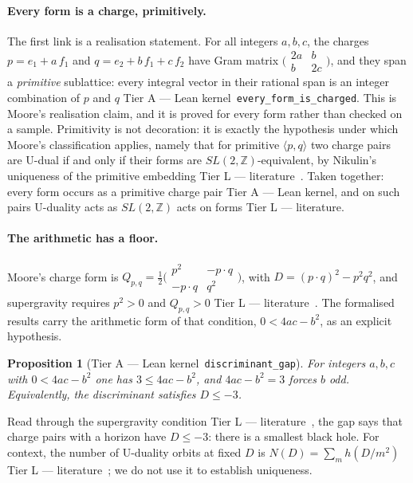 \documentclass[11pt,a4paper]{article}
\newtheorem{proposition}[theorem]{Proposition}
\theoremstyle{remark}
\newcommand{\tierA}{\colorbox{green!15}{\textsf{\scriptsize Tier A --- Lean kernel}}}
\newcommand{\tierL}{\colorbox{blue!10}{\textsf{\scriptsize Tier L --- literature}}}
\newcommand{\lean}[1]{\texttt{#1}}
\begin{document}
\paragraph{Every form is a charge, primitively.} The first link is a realisation statement. For all integers $a,b,c$, the charges $p=e_1+a\,f_1$ and $q=e_2+b\,f_1+c\,f_2$ have Gram matrix $\bigl(\begin{smallmatrix}2a&b\\b&2c\end{smallmatrix}\bigr)$, and they span a \emph{primitive} sublattice: every integral vector in their rational span is an integer combination of $p$ and $q$ \tierA\ \lean{every\_form\_is\_charged}. This is Moore's realisation claim, and it is proved for every form rather than checked on a sample. Primitivity is not decoration: it is exactly the hypothesis under which Moore's classification applies, namely that for primitive $\langle p,q\rangle$ two charge pairs are U-dual if and only if their forms are $SL(2,\mathbb{Z})$-equivalent, by Nikulin's uniqueness of the primitive embedding \tierL\ \cite[(3.11), ll.~1178--1190]{Moore1998}. Taken together: every form occurs as a primitive charge pair \tierA, and on such pairs U-duality acts as $SL(2,\mathbb{Z})$ acts on forms \tierL.

\paragraph{The arithmetic has a floor.} Moore's charge form is $Q_{p,q}=\tfrac12\bigl(\begin{smallmatrix}p^2&-p\cdot q\\-p\cdot q&q^2\end{smallmatrix}\bigr)$, with $D=(p\cdot q)^2-p^2q^2$, and supergravity requires $p^2>0$ and $Q_{p,q}>0$ \tierL\ \cite[(3.4)--(3.5), ll.~1104--1112]{Moore1998}. The formalised results carry the arithmetic form of that condition, $0<4ac-b^2$, as an explicit hypothesis.

\begin{proposition}[\tierA\ \lean{discriminant\_gap}]
For integers $a,b,c$ with $0<4ac-b^2$ one has $3\le 4ac-b^2$, and $4ac-b^2=3$ forces $b$ odd. Equivalently, the discriminant satisfies $D\le-3$.
\end{proposition}

\noindent Read through the supergravity condition \tierL\ \cite[(3.4)--(3.5), ll.~1104--1112]{Moore1998}, the gap says that charge pairs with a horizon have $D\le-3$: there is a smallest black hole. For context, the number of U-duality orbits at fixed $D$ is $N(D)=\sum_m h(D/m^2)$ \tierL\ \cite[(3.17)--(3.18), ll.~1250--1262]{Moore1998}; we do not use it to establish uniqueness.
\end{document}
